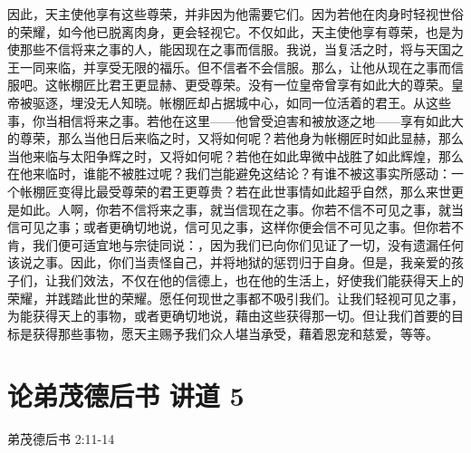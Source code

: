因此，天主使他享有这些尊荣，并非因为他需要它们。因为若他在肉身时轻视世俗的荣耀，如今他已脱离肉身，更会轻视它。不仅如此，天主使他享有尊荣，也是为使那些不信将来之事的人，能因现在之事而信服。我说，当复活之时，将与天国之王一同来临，并享受无限的福乐。但不信者不会信服。那么，让他从现在之事而信服吧。这帐棚匠比君王更显赫、更受尊荣。没有一位皇帝曾享有如此大的尊荣。皇帝被驱逐，埋没无人知晓。帐棚匠却占据城中心，如同一位活着的君王。从这些事，你当相信将来之事。若他在这里——他曾受迫害和被放逐之地——享有如此大的尊荣，那么当他日后来临之时，又将如何呢？若他身为帐棚匠时如此显赫，那么当他来临与太阳争辉之时，又将如何呢？若他在如此卑微中战胜了如此辉煌，那么在他来临时，谁能不被胜过呢？我们岂能避免这结论？有谁不被这事实所感动：一个帐棚匠变得比最受尊荣的君王更尊贵？若在此世事情如此超乎自然，那么来世更是如此。人啊，你若不信将来之事，就当信现在之事。你若不信不可见之事，就当信可见之事；或者更确切地说，信可见之事，这样你便会信不可见之事。但你若不肯，我们便可适宜地与宗徒同说：，因为我们已向你们见证了一切，没有遗漏任何该说之事。因此，你们当责怪自己，并将地狱的惩罚归于自身。但是，我亲爱的孩子们，让我们效法，不仅在他的信德上，也在他的生活上，好使我们能获得天上的荣耀，并践踏此世的荣耀。愿任何现世之事都不吸引我们。让我们轻视可见之事，为能获得天上的事物，或者更确切地说，藉由这些获得那一切。但让我们首要的目标是获得那些事物，愿天主赐予我们众人堪当承受，藉着恩宠和慈爱，等等。\par



\section{论弟茂德后书 讲道 5}

弟茂德后书 2:11-14 \par

 \par

